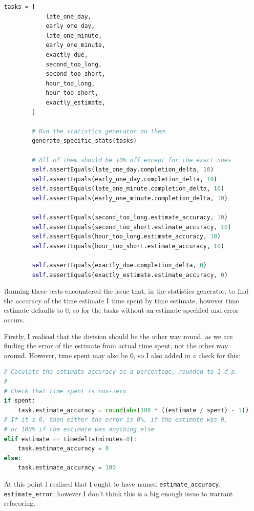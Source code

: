\documentclass{article}
\begin{document}
\begin{lstlisting}[language=Python]
        tasks = [
            late_one_day,
            early_one_day,
            late_one_minute,
            early_one_minute,
            exactly_due,
            second_too_long,
            second_too_short,
            hour_too_long,
            hour_too_short,
            exactly_estimate,
        ]

        # Run the statistics generator on them
        generate_specific_stats(tasks)

        # All of them should be 10% off except for the exact ones
        self.assertEquals(late_one_day.completion_delta, 10)
        self.assertEquals(early_one_day.completion_delta, 10)
        self.assertEquals(late_one_minute.completion_delta, 10)
        self.assertEquals(early_one_minute.completion_delta, 10)

        self.assertEquals(second_too_long.estimate_accuracy, 10)
        self.assertEquals(second_too_short.estimate_accuracy, 10)
        self.assertEquals(hour_too_long.estimate_accuracy, 10)
        self.assertEquals(hour_too_short.estimate_accuracy, 10)

        self.assertEquals(exactly_due.completion_delta, 0)
        self.assertEquals(exactly_estimate.estimate_accuracy, 0)
\end{lstlisting}

Running these tests encountered the issue that,
in the statistics generator,
to find the accuracy of the time estimate I time spent by time estimate,
however time estimate defaults to 0,
so for the tasks without an estimate specified and error occurs.

Firstly,
I realised that the division should be the other way round,
as we are finding the error of the estimate from actual time spent,
not the other way around.
However,
time spent may also be 0,
so I also added in a check for this:
\begin{lstlisting}[language=Python]
# Caculate the estimate accuracy as a percentage, rounded to 1 d.p.
#
# Check that time spent is non-zero
if spent:
    task.estimate_accuracy = round(abs(100 * ((estimate / spent) - 1)), 1)
# If it's 0, then either the error is 0%, if the estimate was 0,
# or 100% if the estimate was anything else
elif estimate == timedelta(minutes=0):
    task.estimate_accuracy = 0
else:
    task.estimate_accuracy = 100
\end{lstlisting}

At this point I realised that I ought to have named \texttt{estimate\_accuracy},
\texttt{estimate\_error},
however I don't think this is a big enough issue to warrant refacoring.
\end{document}
